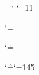 







\chardef\atcode=\catcode`\@	%
\catcode`\@=11			%

\let\@acci=\'
\let\@accii=\`
\let\@acciii=\=

\catcode`\@=\atcode		%







\def\lq{\char145 } \def\rq{\char39 }


\catcode`\"=\dblcode	%


\catcode`\`=\active \chardef`=145

